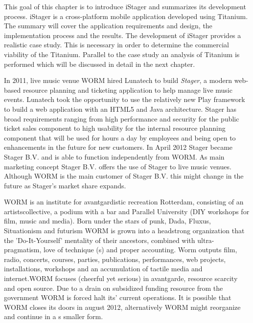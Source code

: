 This goal of this chapter is to introduce iStager and summarizes its development process. iStager is a cross-platform mobile application developed using Titanium. The summary will cover the application requirements and design, the implementation process and the results. 
The development of iStager provides a realistic case study. This is necessary in order to determine the commercial viability of the Titanium. Parallel to the case study an analysis of Titanium is performed which will be discussed in detail in the next chapter.






In 2011, live music venue WORM hired Lunatech to build \emph{Stager}, a modern web-based resource planning and ticketing application to help manage live music events. Lunatech took the opportunity to use the relatively new Play framework to build a web application with an HTML5 and Java architecture. Stager has broad requirements ranging from high performance and security for the public ticket sales component to high usability for the internal resource planning component that will be used for hours a day by employees and being open to enhancements in the future for new customers. \cite{Lunatech2011} In April 2012 Stager became Stager B.V. and is able to function independently from WORM. As main marketing concept Stager B.V. offers the use of Stager  to live music venues. Although WORM is the main customer of Stager B.V. this might change in the future as Stager's market share expands. 

WORM is an institute for avantgardistic recreation Rotterdam, consisting of an artistscollective, a podium with a bar and Parallel University (DIY workshops for film, music and media). Born under the stars of punk, Dada, Fluxus, Situationism and futurism WORM is grown into a headstrong organization that the 'Do-It-Yourself' mentality of their ancestors, combined with ultra-pragmatism, love of technique (s) and proper accounting. Worm outputs film, radio, concerts, courses, parties, publications, performances, web projects, installations, workshops and an accumulation of tactile media and internet.WORM focuses (cheerful yet serious) in avantgarde, resource scarcity and open source. \cite{WORM2012} Due to a drain on subsidized funding resource from the government WORM is forced halt its' current operations. It is possible that WORM closes its doors in august 2012, alternatively WORM might reorganize and continue in a s smaller form.

